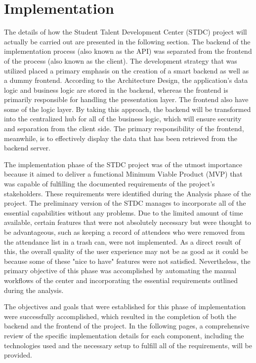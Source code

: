 \section{Implementation}
\begin{justify}
    The details of how the Student Talent Development Center (STDC) project will actually be carried out are presented in the following section. The backend of the implementation process (also known as the API) was separated from the frontend of the process (also known as the client). The development strategy that was utilized placed a primary emphasis on the creation of a smart backend as well as a dummy frontend. According to the Architecture Design, the application's data logic and business logic are stored in the backend, whereas the frontend is primarily responsible for handling the presentation layer. The frontend also have some of the logic layer. By taking this approach, the backend will be transformed into the centralized hub for all of the business logic, which will ensure security and separation from the client side. The primary responsibility of the frontend, meanwhile, is to effectively display the data that has been retrieved from the backend server.

    \vspace{0.25cm}
    \newendline The implementation phase of the STDC project was of the utmost importance because it aimed to deliver a functional Minimum Viable Product (MVP) that was capable of fulfilling the documented requirements of the project's stakeholders. These requirements were identified during the Analysis phase of the project. The preliminary version of the STDC manages to incorporate all of the essential capabilities without any problems. Due to the limited amount of time available, certain features that were not absolutely necessary but were thought to be advantageous, such as keeping a record of attendees who were removed from the attendance list in a trash can, were not implemented. As a direct result of this, the overall quality of the user experience may not be as good as it could be because some of these "nice to have" features were not satisfied. Nevertheless, the primary objective of this phase was accomplished by automating the manual workflows of the center and incorporating the essential requirements outlined during the analysis.

    \vspace{0.25cm}
    \newendline The objectives and goals that were established for this phase of implementation were successfully accomplished, which resulted in the completion of both the backend and the frontend of the project. In the following pages, a comprehensive review of the specific implementation details for each component, including the technologies used and the necessary setup to fulfill all of the requirements, will be provided.



\end{justify}
